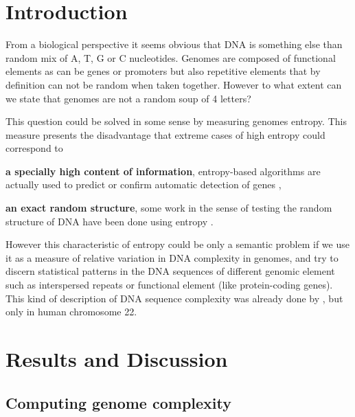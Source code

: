 

\section{Introduction}
\label{sec:dna_struct-intro}

From a biological perspective it seems obvious that DNA is something else than random mix of A, T, G or C nucleotides. Genomes are composed of functional elements as can be genes or promoters but also repetitive elements that by definition can not be random when taken together. However to what extent can we state that genomes are not a random soup of 4 letters? 

This question could be solved in some sense by measuring genomes entropy. This measure presents the disadvantage that extreme cases of high entropy could correspond to \begin{inparaenum} \item {\bf a specially high content of information}, entropy-based algorithms are actually used to predict or confirm automatic detection of genes \cite{Du2006,Gerstein2007}, \item {\bf an exact random structure}, some work in the sense of testing the random structure of DNA have been done using entropy \cite{Loewenstern1999}. \end{inparaenum} However this characteristic of entropy could be only a semantic problem if we use it as a measure of relative variation in DNA complexity in genomes, and try to discern statistical patterns in the DNA sequences of different genomic element such as interspersed repeats or functional element (like protein-coding genes). This kind of description of DNA sequence complexity was already done by \cite{Holste2001}, but only in human chromosome 22.

\section{Results and Discussion}
\label{sec:dna_struct-result}

\subsection{Computing genome complexity}
\label{sec:comp-genome-compl}

